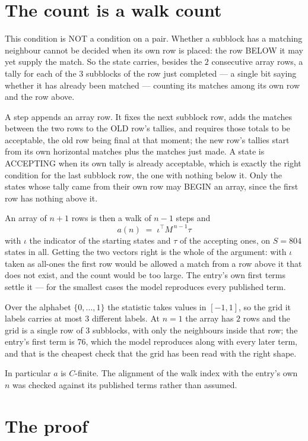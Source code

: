 \documentclass[11pt,a4paper]{article}
\theoremstyle{plain}
\theoremstyle{definition}
\begin{document}
\section{The count is a walk count}

This condition is NOT a condition on a pair. Whether a subblock has a
matching neighbour cannot be decided when its own row is placed: the row BELOW it may yet
supply the match. So the state carries, besides the $2$ consecutive array rows, a tally for
each of the $3$ subblocks of the row just completed --- a single bit saying whether it has already been matched --- counting its matches
among its own row and the row above.

A step appends an array row. It fixes the next subblock row, adds the matches between the two
rows to the OLD row's tallies, and requires those totals to be acceptable, the old row being
final at that moment; the new row's tallies start from its own horizontal matches plus the
matches just made. A state is ACCEPTING when its own tally is already acceptable, which is
exactly the right condition for the last subblock row, the one with nothing below it. Only the
states whose tally came from their own row may BEGIN an array, since the first row has nothing
above it.

An array of $n+1$ rows is then a walk of $n-1$ steps and
\[
a(n)\;=\;\iota^{\!\top}M^{\,n-1}\tau
\]
with $\iota$ the indicator of the starting states and $\tau$ of the accepting ones, on
$S=804$ states in all. Getting the two vectors right is the whole of the argument: with
$\iota$ taken as all-ones the first row would be allowed a match from a row above it that does
not exist, and the count would be too large. The entry's own first terms settle it --- for
the smallest cases
the model reproduces every published term.

Over the alphabet $\{0,\dots,1\}$ the statistic takes values in $[-1,1]$, so the
grid it labels carries at most $3$ different labels. At $n=1$ the array has $2$
rows and the grid is a single row of $3$
subblocks, with only the neighbours inside that row; the entry's first term is
$76$, which the model reproduces along with every later term, and that is the cheapest
check that the grid has been read with the right shape.

In particular $a$ is $C$-finite. The alignment of the walk index with the entry's own $n$ was
checked against its published terms rather than assumed.

\section{The proof}
\end{document}
